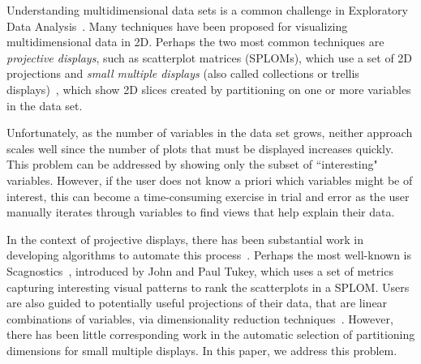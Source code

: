 

Understanding multidimensional data sets is a common challenge in Exploratory Data Analysis~\cite{Tukey1977}. Many techniques have been proposed for visualizing multidimensional data in 2D. Perhaps the two most common techniques are \emph{projective displays}, such as scatterplot matrices (SPLOMs), which use a set of 2D projections and \emph{small multiple displays} (also called collections or trellis displays)~\cite{Bertin1983, tufte1986, Becker1996}, which show 2D slices created by partitioning on one or more variables in the data set.

Unfortunately, as the number of variables in the data set grows, neither approach scales well since the number of plots that must be displayed increases quickly. This problem can be addressed by showing only the subset of ``interesting" variables. However, if the user does not know a priori which variables might be of interest, this can become a time-consuming exercise in trial and error as the user manually iterates through variables to find views that help explain their data. 

In the context of projective displays, there has been substantial work in developing algorithms to automate this process~\cite{Seo2005,Wilkinson2005,Sips2009}.
Perhaps the most well-known is Scagnostics~\cite{Tukey1985}, introduced by John and Paul Tukey, which uses a set of metrics capturing interesting visual patterns to rank the scatterplots in a SPLOM. Users are also guided to potentially useful projections of their data, that are linear combinations of variables, via dimensionality reduction techniques~\cite{Friedman1974,Yang2003,Sedlmair2013}.
However, there has been little corresponding work in the automatic selection of partitioning dimensions for small multiple displays. In this paper, we address this problem.

